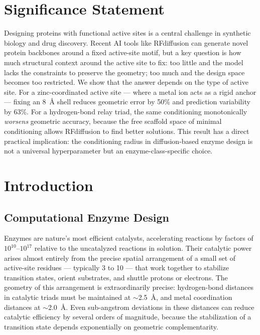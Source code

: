 \documentclass[11pt,letterpaper]{article}
\begin{document}
\section*{Significance Statement}
\begin{mdframed}
Designing proteins with functional active sites is a central challenge in synthetic biology and drug discovery. Recent AI tools like RFdiffusion can generate novel protein backbones around a fixed active-site motif, but a key question is how much structural context around the active site to fix: too little and the model lacks the constraints to preserve the geometry; too much and the design space becomes too restricted. We show that the answer depends on the type of active site. For a zinc-coordinated active site — where a metal ion acts as a rigid anchor — fixing an 8~\AA{} shell reduces geometric error by 50\% and prediction variability by 63\%. For a hydrogen-bond relay triad, the same conditioning monotonically \emph{worsens} geometric accuracy, because the free scaffold space of minimal conditioning allows RFdiffusion to find better solutions. This result has a direct practical implication: the conditioning radius in diffusion-based enzyme design is not a universal hyperparameter but an enzyme-class-specific choice.
\end{mdframed}

\section{Introduction}

\subsection{Computational Enzyme Design}

Enzymes are nature's most efficient catalysts, accelerating reactions by factors of $10^{10}$--$10^{17}$ relative to the uncatalyzed reactions in solution. Their catalytic power arises almost entirely from the precise spatial arrangement of a small set of active-site residues — typically 3 to 10 — that work together to stabilize transition states, orient substrates, and shuttle protons or electrons. The geometry of this arrangement is extraordinarily precise: hydrogen-bond distances in catalytic triads must be maintained at $\sim$2.5~\AA{}, and metal coordination distances at $\sim$2.0~\AA{}. Even sub-angstrom deviations in these distances can reduce catalytic efficiency by several orders of magnitude, because the stabilization of a transition state depends exponentially on geometric complementarity.
\end{document}
